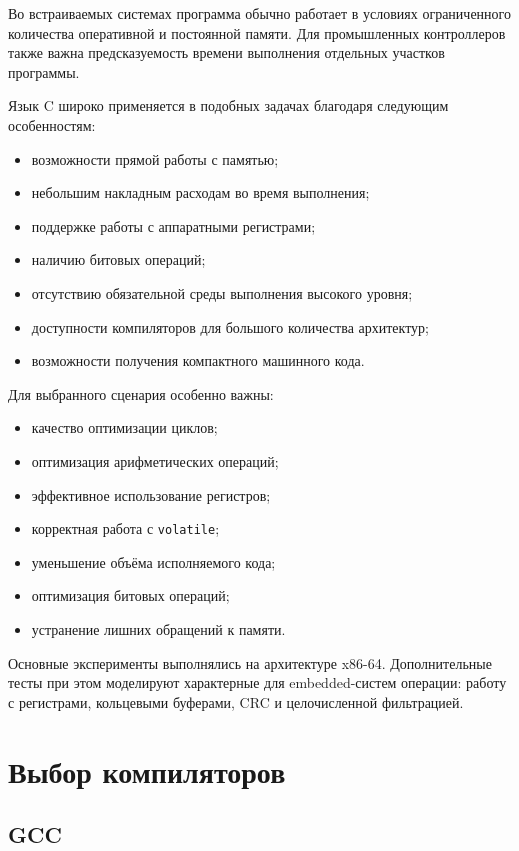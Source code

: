 \documentclass[12pt,a4paper]{article}
\begin{document}
Во встраиваемых системах программа обычно работает в условиях ограниченного количества оперативной и постоянной памяти. Для промышленных контроллеров также важна предсказуемость времени выполнения отдельных участков программы.

Язык C широко применяется в подобных задачах благодаря следующим особенностям:
\begin{itemize}
    \item возможности прямой работы с памятью;
    \item небольшим накладным расходам во время выполнения;
    \item поддержке работы с аппаратными регистрами;
    \item наличию битовых операций;
    \item отсутствию обязательной среды выполнения высокого уровня;
    \item доступности компиляторов для большого количества архитектур;
    \item возможности получения компактного машинного кода.
\end{itemize}

Для выбранного сценария особенно важны:
\begin{itemize}
    \item качество оптимизации циклов;
    \item оптимизация арифметических операций;
    \item эффективное использование регистров;
    \item корректная работа с \texttt{volatile};
    \item уменьшение объёма исполняемого кода;
    \item оптимизация битовых операций;
    \item устранение лишних обращений к памяти.
\end{itemize}

Основные эксперименты выполнялись на архитектуре x86-64. Дополнительные тесты при этом моделируют характерные для embedded-систем операции: работу с регистрами, кольцевыми буферами, CRC и целочисленной фильтрацией.

\section{Выбор компиляторов}

\subsection{GCC}
\end{document}
